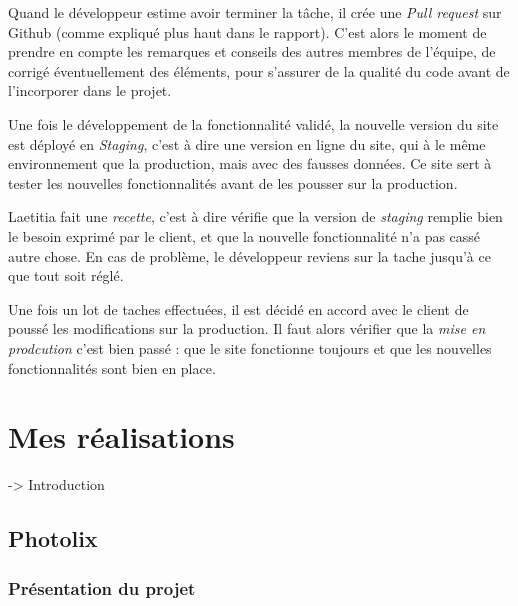 \documentclass[12pt,a4paper]{article}
\begin{document}
  \bigskip

  Quand le développeur estime avoir terminer la tâche, il crée une
  \emph{Pull request} sur Github (comme expliqué plus haut dans le
  rapport). C'est alors le moment de prendre en compte les remarques et
  conseils des autres membres de l'équipe, de corrigé éventuellement des
  éléments, pour s'assurer de la qualité du code avant de l'incorporer
  dans le projet.

  \bigskip

  Une fois le développement de la fonctionnalité validé, la nouvelle
  version du site est déployé en \emph{Staging}, c'est à dire une version
  en ligne du site, qui à le même environnement que la production, mais
  avec des fausses données. Ce site sert à tester les nouvelles
  fonctionnalités avant de les pousser sur la production.

  \bigskip

  Laetitia fait une \emph{recette}, c'est à dire vérifie que la version de
  \emph{staging} remplie bien le besoin exprimé par le client, et que la
  nouvelle fonctionnalité n'a pas cassé autre chose. En cas de problème,
  le développeur reviens sur la tache jusqu'à ce que tout soit réglé.

  \bigskip

  Une fois un lot de taches effectuées, il est décidé en accord avec le
  client de poussé les modifications sur la production. Il faut alors
  vérifier que la \emph{mise en prodcution} c'est bien passé : que le site
  fonctionne toujours et que les nouvelles fonctionnalités sont bien en
  place.

  \newpage

  \section{Mes réalisations}\label{mes-ruxe9alisations}

  \bigskip

  -\textgreater{} Introduction

  \subsection{Photolix}\label{photolix}

  \subsubsection{Présentation du projet}\label{pruxe9sentation-du-projet}
\end{document}
